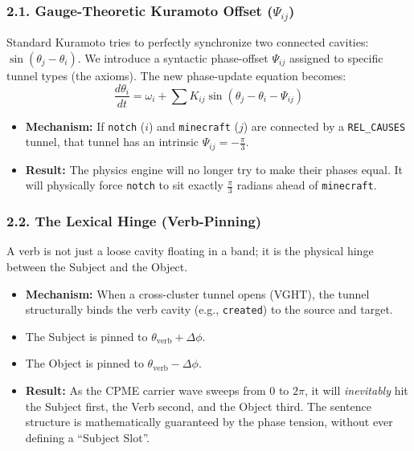 \documentclass[
  11pt,
  a4paper,
]{article}
\providecommand{\tightlist}{%
  \setlength{\itemsep}{0pt}\setlength{\parskip}{0pt}}
\begin{document}
\subsubsection{\texorpdfstring{2.1. Gauge-Theoretic Kuramoto Offset
(\(\Psi_{ij}\))}{2.1. Gauge-Theoretic Kuramoto Offset (\textbackslash Psi\_\{ij\})}}\label{gauge-theoretic-kuramoto-offset-psi_ij}

Standard Kuramoto tries to perfectly synchronize two connected cavities:
\(\sin(\theta_j - \theta_i)\). We introduce a syntactic phase-offset
\(\Psi_{ij}\) assigned to specific tunnel types (the axioms). The new
phase-update equation becomes:
\[ \frac{d\theta_i}{dt} = \omega_i + \sum K_{ij} \sin(\theta_j - \theta_i - \Psi_{ij}) \]

\begin{itemize}
\tightlist
\item
  \textbf{Mechanism:} If \texttt{notch} (\(i\)) and \texttt{minecraft}
  (\(j\)) are connected by a \texttt{REL\_CAUSES} tunnel, that tunnel
  has an intrinsic \(\Psi_{ij} = -\frac{\pi}{3}\).
\item
  \textbf{Result:} The physics engine will no longer try to make their
  phases equal. It will physically force \texttt{notch} to sit exactly
  \(\frac{\pi}{3}\) radians ahead of \texttt{minecraft}.
\end{itemize}

\subsubsection{2.2. The Lexical Hinge
(Verb-Pinning)}\label{the-lexical-hinge-verb-pinning}

A verb is not just a loose cavity floating in a band; it is the physical
hinge between the Subject and the Object.

\begin{itemize}
\tightlist
\item
  \textbf{Mechanism:} When a cross-cluster tunnel opens (VGHT), the
  tunnel structurally binds the verb cavity (e.g., \texttt{created}) to
  the source and target.
\item
  The Subject is pinned to \(\theta_{\text{verb}} + \Delta\phi\).
\item
  The Object is pinned to \(\theta_{\text{verb}} - \Delta\phi\).
\item
  \textbf{Result:} As the CPME carrier wave sweeps from \(0\) to
  \(2\pi\), it will \emph{inevitably} hit the Subject first, the Verb
  second, and the Object third. The sentence structure is mathematically
  guaranteed by the phase tension, without ever defining a ``Subject
  Slot''.
\end{itemize}
\end{document}
